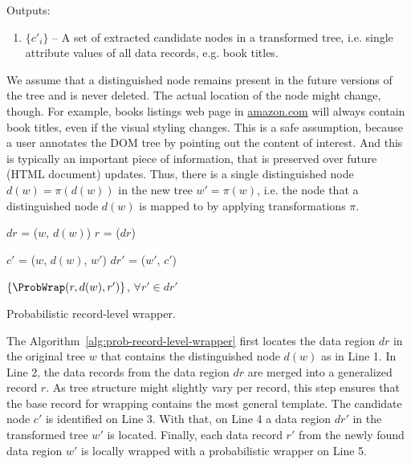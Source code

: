 Outputs: 

\begin{enumerate}
	\item $\{c'_i\}$ -- A set of extracted candidate nodes in a transformed tree, i.e. single attribute values of all data records, e.g. book titles.
\end{enumerate}

We assume that a distinguished node remains present in the future versions of the tree and is never deleted. The actual location of the node might change, though. For example, books listings web page in \url{amazon.com} will always contain book titles, even if the visual styling changes. This is a safe assumption, because a user annotates the DOM tree by pointing out the content of interest. And this is typically an important piece of information, that is preserved over future (HTML document) updates. Thus, there is a single distinguished node $d(w) = \pi(d(w))$ in the new tree $w'=\pi(w)$, i.e. the node that a distinguished node $d(w)$ is mapped to by applying transformations $\pi$.

\IncMargin{2em}
\begin{algorithm}[h]

	\DontPrintSemicolon

	\BlankLine

	$dr$ = \LocateDataRegionContainingNode($w$, $d(w)$) \;
	$r$ = \MergeDataRecords($dr$) \;

	$c'$ = \ProbWrap($w$, $d(w)$, $w'$) \;
	$dr'$ = \LocateDataRegionContainingNode($w'$, $c'$) \;

	\Return $\left\{ \ProbWrap(r, d(w), r') \right\}$, $\forall r' \in dr'$ \;

	\caption{Probabilistic record-level wrapper.}
	\label{alg:prob-record-level-wrapper}

\end{algorithm}
\DecMargin{2em}

The Algorithm~\ref{alg:prob-record-level-wrapper} first locates the data region $dr$ in the original tree $w$ that contains the distinguished node $d(w)$ as in Line 1. In Line 2, the data records from the data region $dr$ are merged into a generalized record $r$. As tree structure might slightly vary per record, this step ensures that the base record for wrapping contains the most general template. The candidate node $c'$ is identified on Line 3. With that, on Line 4 a data region $dr'$ in the transformed tree $w'$ is located. Finally, each data record $r'$ from the newly found data region $w'$ is locally wrapped with a probabilistic wrapper on Line 5.

